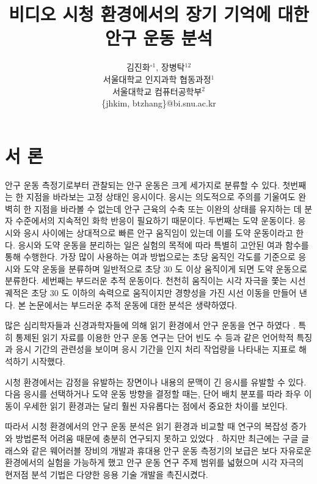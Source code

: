 \documentclass{kcc}
\title{비디오 시청 환경에서의 장기 기억에 대한 안구 운동 분석}
\author{
김진화$^{\circ1}$, 장병탁$^{12}$\\
서울대학교 인지과학 협동과정$^{1}$\\
서울대학교 컴퓨터공학부$^{2}$\\
\{jhkim, btzhang\}@bi.snu.ac.kr
}
\begin{document}
\maketitle


\section{서 론}

안구 운동 측정기로부터 관찰되는 안구 운동은 크게 세가지로 분류할 수 있다. 첫번째는 한 지점을 바라보는 고정 상태인 응시이다. 응시는 의도적으로 주의를 기울여도 완벽히 한 지점을 바라볼 수 없는데 안구 근육의 수축 또는 이완의 상태를 유지하는 데 분자 수준에서의 지속적인 화학 반응이 필요하기 때문이다. 두번째는 도약 운동이다. 응시와 응시 사이에는 상대적으로 빠른 안구 움직임이 있는데 이를 도약 운동이라고 한다. 응시와 도약 운동을 분리하는 일은 실험의 목적에 따라 특별히 고안된 여과 함수를 통해 수행한다. 가장 많이 사용하는 여과 방법으로는 초당 움직인 각도를 기준으로 응시와 도약 운동을 분류하며 일반적으로 초당 30 도 이상 움직이게 되면 도약 운동으로 분류한다. 세번째는 부드러운 추적 운동이다. 천천히 움직이는 시각 자극을 쫓는 시선 궤적은 초당 30 도 이하의 속력으로 움직이지만 경향성을 가진 시선 이동을 만들어 낸다. 본 논문에서는 부드러운 추적 운동에 대한 분석은 생략하였다.

많은 심리학자들과 신경과학자들에 의해 읽기 환경에서 안구 운동을 연구 하였다 \cite{Rayner1998,Reichle1998}. 특히 통제된 읽기 자료를 이용한 안구 운동 연구\cite{Inhoff1986,Rayner1986}는 단어 빈도 수 등과 같은 언어학적 특징과 응시 기간의 관련성을 보이며 응시 기간을 인지 처리 작업량을 나타내는 지표로 해석하기 시작했다. 

시청 환경에서는 감정을 유발하는 장면이나 내용의 문맥이 긴 응시를 유발할 수 있다. 다음 응시를 선택하거나 도약 운동 방향을 결정할 때는, 단어 배치 분포를 따라 좌우 이동이 우세한 읽기 환경과는 달리 훨씬 자유롭다는 점에서 중요한 차이를 보인다.

따라서 시청 환경에서의 안구 운동 분석은 읽기 환경과 비교할 때 연구의 복잡성 증가\cite{Choe2013}와 방법론적 어려움 때문에 충분히 연구되지 못하고 있었다 \cite{Tatler2011}. 하지만 최근에는 구글 글래스와 같은 웨어러블 장비의 개발과 휴대용 안구 운동 측정기의 보급은 보다 자유로운 환경에서의 실험을 가능하게 했고 안구 운동 연구 주제 범위를 넓혔으며 시각 자극의 현저점 분석 기법\cite{itti1998model}은 다양한 응용 기술 개발을 촉진시켰다. 
\end{document}
